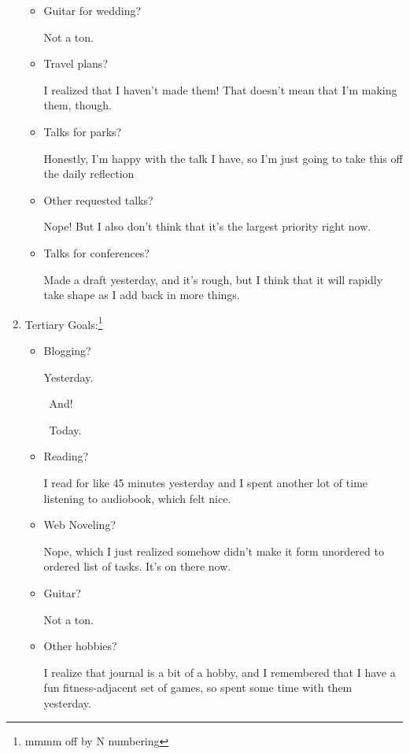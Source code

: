 \documentclass[12pt]{article}
\renewcommand{\,}{\textsuperscript{,}}
\begin{document}
\begin{enumerate}
\begin{itemize}

\item Guitar for wedding?

Not a ton.

\item Travel plans?

I realized that I haven't made them! That doesn't mean that I'm making them, though.

\item Talks for parks?

Honestly, I'm happy with the talk I have, so I'm just going to take this off the daily reflection

\item Other requested talks?

Nope! But I also don't think that it's the largest priority right now.

\item Talks for conferences?

Made a draft yesterday, and it's rough, but I think that it will rapidly take shape as I add back in more things.

\end{itemize}

\item Tertiary Goals:\footnote{mmmm off by N numbering}

\begin{itemize}

\item Blogging?

Yesterday.

 And!

 Today.

\item Reading?

I read for like 45 minutes yesterday and I spent another lot of time listening to audiobook, which felt nice.

\item Web Noveling?

Nope, which I just realized somehow didn't make it form unordered to ordered list of tasks.  
It's on there now.

\item Guitar?

Not a ton.

\item Other hobbies?

I realize that journal is a bit of a hobby, and I remembered that I have a fun fitness-adjacent set of games, so spent some time with them yesterday.


\end{itemize}
\end{enumerate}
\end{document}
